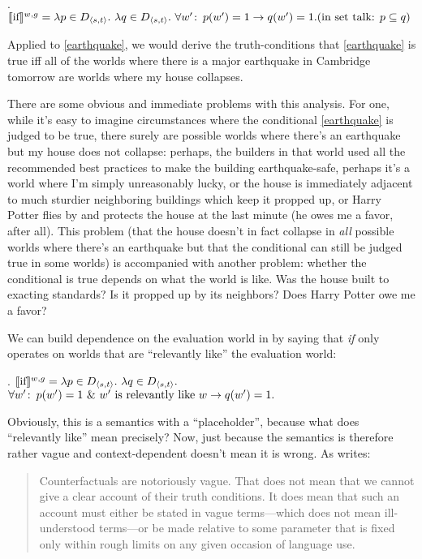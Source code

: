 \ex. $\llbracket \mbox{if} \rrbracket^{w,g} = \lambda p \in D_{\langle s,t \rangle}.\ \lambda q \in D_{\langle s,t \rangle}.\ \forall w'\colon\thinspace p(w')=1 \rightarrow q(w')=1.\\[6pt]
(\mbox{in set talk: } p \subseteq q)$

Applied to \ref{earthquake}, we would derive the truth-conditions that \ref{earthquake} is true iff all of the worlds where there is a major earthquake in Cambridge tomorrow are worlds where my house collapses.

There are some obvious and immediate problems with this analysis. For one, while
it's easy to imagine circumstances where the conditional \ref{earthquake} is
judged to be true, there surely are possible worlds where there's an earthquake
but my house does not collapse: perhaps, the builders in that world used all the
recommended best practices to make the building earthquake-safe, perhaps it's a
world where I'm simply unreasonably lucky, or the house is immediately adjacent
to much sturdier neighboring buildings which keep it propped up, or Harry Potter
flies by and protects the house at the last minute (he owes me a favor, after
all). This problem (that the house doesn't in fact collapse in \emph{all}
possible worlds where there's an earthquake but that the conditional can still
be judged true in some worlds) is accompanied with another problem: whether the
conditional is true depends on what the world is like. Was the house built to
exacting standards? Is it propped up by its neighbors? Does Harry Potter owe me
a favor?

We can build dependence on the evaluation world in by saying that \emph{if} only
operates on worlds that are ``relevantly like'' the evaluation world:

\ex.\label{ex:if-strict-context} $\llbracket \mbox{if} \rrbracket^{w,g} = \lambda p \in D_{\langle s,t \rangle}.\ \lambda q \in
D_{\langle s,t \rangle}.$ \\ \null\hfill $\forall w'\colon\thinspace p(w')=1\ \&\ w' \text{ is
  relevantly like } w \rightarrow q(w')=1.$

Obviously, this is a semantics with a ``placeholder'', because what does
``relevantly like'' mean precisely? Now, just because the semantics is therefore
rather vague and context-dependent doesn't mean it is wrong. As
\textcite{lewis:1973:counterfactuals} writes:

\begin{quote} Counterfactuals are notoriously vague. That does not mean that we
cannot give a clear account of their truth conditions. It does mean that such an
account must either be stated in vague terms---which does not mean ill-understood
terms---or be made relative to some parameter that is fixed only within rough
limits on any given occasion of language use.
\end{quote}

